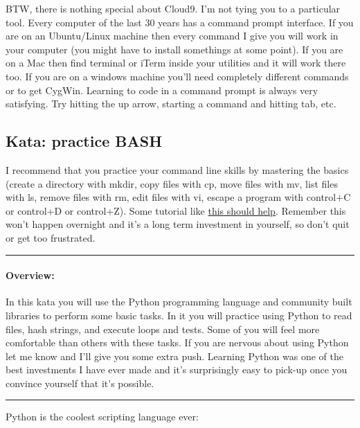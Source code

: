 \documentclass[12pt]{book}
\newenvironment{overview}
  {\noindent\rule{\textwidth}{0.4pt}
  \paragraph{Overview:}
  }
  {\par
  \noindent\rule{\textwidth}{0.4pt}
  }
\begin{document}
 BTW, there is nothing special about Cloud9. I'm not tying you to a particular tool. Every computer of the last 30 years has a command prompt interface. If you are on an Ubuntu/Linux machine then every command I give you will work in your computer (you might have to install somethings at some point). If you are on a Mac then find terminal or iTerm inside your utilities and it will work there too. If you are on a windows machine you'll need completely different commands or to get CygWin. Learning to code in a command prompt is always very satisfying. Try hitting the up arrow, starting a command and hitting tab, etc.

 \subsection{Kata: practice BASH}
 I recommend that you practice your command line skills by mastering the basics (create a directory with mkdir, copy files with cp, move files with mv, list files with ls, remove files with rm, edit files with vi, escape a program with control+C or control+D or control+Z). Some tutorial like \href{http://www.linux-tutorial.info/modules.php?name=MContent&pageid=16}{this should help}. Remember this won't happen overnight and it's a long term investment in yourself, so don't quit or get too frustrated.

\begin{overview}
In this kata you will use the Python programming language and community built libraries to perform some basic tasks. In it you will practice using Python to read files, hash strings, and execute loops and tests. Some of you will feel more comfortable than others with these tasks. If you are nervous about using Python let me know and I'll give you some extra push. Learning Python was one of the best investments I have ever made and it's surprisingly easy to pick-up once you convince yourself that it's possible.
\end{overview}
\newpage

Python is the coolest scripting language ever:
\end{document}
